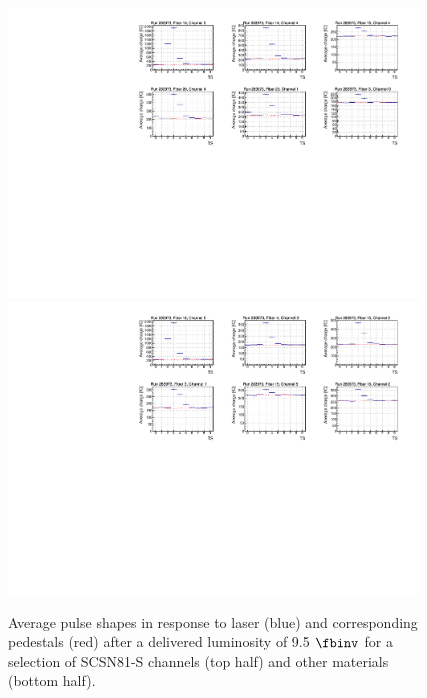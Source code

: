 \begin{figure}[tbp!]
\centering
\includegraphics[width=0.97\textwidth]{figures/analysis/Pulse_shape_run283973_bright_SCSN81S.pdf}
\includegraphics[width=0.97\textwidth]{figures/analysis/Pulse_shape_run283973_bright_others.pdf}
\caption{Average pulse shapes in response to laser (blue) and corresponding pedestals (red) after a delivered luminosity of 9.5 $\fbinv$ for a selection of SCSN81-S channels (top half) and other materials (bottom half).}
\label{pulse9p5ifb}
\end{figure} 


